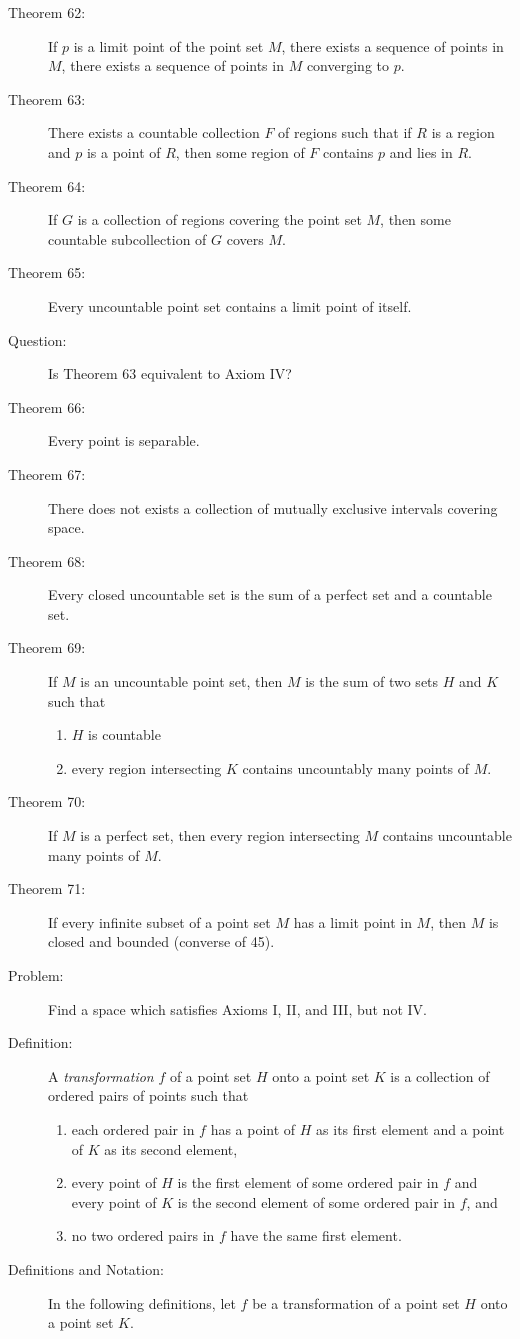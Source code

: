 \documentclass{article}
\begin{document}
\begin{description}
  \item[Theorem 62:] If $p$ is a limit point of the point set $M$, there exists a sequence of points in $M$, there exists a sequence of points in $M$ converging to $p$.
  \item[Theorem 63:] There exists a countable collection $F$ of regions such that if $R$ is a region and $p$ is a point of $R$, then some region of $F$ contains $p$ and lies in $R$.
  \item[Theorem 64:] If $G$ is a collection of regions covering the point set $M$, then some countable subcollection of $G$ covers $M$.
  \item[Theorem 65:] Every uncountable point set contains a limit point of itself.
  \item[Question:] Is Theorem 63 equivalent to Axiom IV?
  \item[Theorem 66:] Every point is separable.
  \item[Theorem 67:] There does not exists a collection of mutually exclusive intervals covering space.
  \item[Theorem 68:] Every closed uncountable set is the sum of a perfect set and a countable set.
  \item[Theorem 69:] If $M$ is an uncountable point set, then $M$ is the sum of two sets $H$ and $K$ such that 
    \begin{enumerate}[(1)]
      \item $H$ is countable
      \item every region intersecting $K$ contains uncountably many points of $M$.
    \end{enumerate}
  \item[Theorem 70:] If $M$ is a perfect set, then every region intersecting $M$ contains uncountable many points of $M$.
  \item[Theorem 71:] If every infinite subset of a point set $M$ has a limit point in $M$, then $M$ is closed and bounded (converse of 45).
  \item[Problem:] Find a space which satisfies Axioms I, II, and III, but not IV.
  \item[Definition:] A \emph{transformation} $f$ of a point set $H$ onto a point set $K$ is a collection of ordered pairs of points such that
    \begin{enumerate}[(1)]
      \item each ordered pair in $f$ has a point of $H$ as its first element and a point of $K$ as its second element,
      \item every point of $H$ is the first element of some ordered pair in $f$ and every point of $K$ is the second element of some ordered pair in $f$, and
      \item no two ordered pairs in $f$ have the same first element.
    \end{enumerate}
  \item[Definitions and Notation:] In the following definitions, let $f$ be a transformation of a point set $H$ onto a point set $K$.


\end{description}
\end{document}
